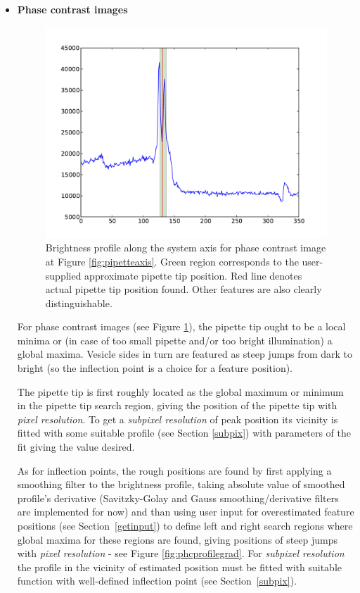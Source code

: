 \begin{itemize}
	\item \textbf{Phase contrast images} \label{phcfeatures}
		
		\begin{figure}
		\includegraphics[width=\columnwidth]{figs/phcaxisprofile.pdf}%
		\caption{Brightness profile along the system axis for phase contrast image at Figure \ref{fig:pipetteaxis}. Green region corresponds to the user-supplied approximate pipette tip position. Red line denotes actual pipette tip position found. Other features are also clearly distinguishable.}%
		\label{fig:phcaxisprofile}%
		\end{figure}
		
		For phase contrast images (see Figure \ref{fig:phcaxisprofile}), the pipette tip ought to be a local minima or (in case of too small pipette and/or too bright illumination) a global maxima. Vesicle sides in turn are featured as steep jumps from dark to bright (so the inflection point is a choice for a feature position). 
		
		The pipette tip is first roughly located as the global maximum or minimum in the pipette tip search region, giving the position of the pipette tip with \emph{pixel resolution}. To get a \emph{subpixel resolution} of peak position its vicinity is fitted with some suitable profile (see Section \ref{subpix}) with parameters of the fit giving the value desired.
		
		As for inflection points, the rough positions are found by first applying a smoothing filter to the brightness profile, taking absolute value of smoothed profile's derivative (Savitzky-Golay \cite{Savitzky1964, Steinier1972} and Gauss smoothing/derivative filters are implemented for now) and than using user input for overestimated feature positions (see Section~\ref{getinput}) to define left and right search regions where global maxima for these regions are found, giving positions of steep jumps with \emph{pixel resolution} - see Figure \ref{fig:phcprofilegrad}. For \emph{subpixel resolution} the profile in the vicinity of estimated position must be fitted with suitable function with well-defined inflection point (see Section~\ref{subpix}).
		

\end{itemize}
